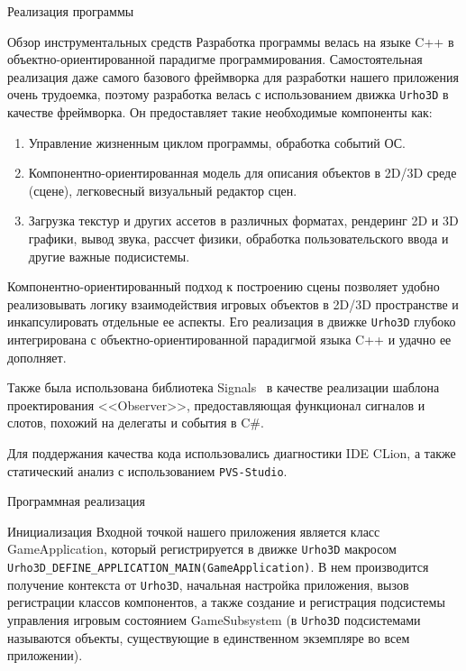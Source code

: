 \documentclass[a4paper, 14pt]{extarticle}
\begin{document}
\begin{section}{Реализация программы}
\begin{subsection}{Обзор инструментальных средств}
Разработка программы велась на языке C++ в объектно-ориентированной парадигме программирования.
Самостоятельная реализация даже самого базового фреймворка для разработки нашего приложения очень трудоемка, поэтому разработка велась с использованием движка \verb|Urho3D| в качестве фреймворка.
Он предоставляет такие необходимые компоненты как:
\begin{enumerate}
\item Управление жизненным циклом программы, обработка событий ОС.
\item Компонентно-ориентированная модель для описания объектов в 2D/3D среде (сцене), легковесный визуальный редактор сцен.
\item Загрузка текстур и других ассетов в различных форматах, рендеринг 2D и 3D графики, вывод звука, рассчет физики, обработка пользовательского ввода и другие важные подисистемы.
\end{enumerate}

Компонентно-ориентированный подход к построению сцены позволяет удобно реализовывать логику взаимодействия игровых объектов в 2D/3D пространстве и инкапсулировать отдельные ее аспекты.
Его реализация в движке \verb|Urho3D| глубоко интегрирована с объектно-ориентированной парадигмой языка C++ и удачно ее дополняет.

Также была использована библиотека Signals~\cite{signals} в качестве реализации шаблона проектирования <<Observer>>, предоставляющая функционал сигналов и слотов, похожий на делегаты и события в C\#.

Для поддержания качества кода использовались диагностики IDE CLion, а также статический анализ с использованием \verb|PVS-Studio|.
\end{subsection}

\begin{subsection}{Программная реализация}
\begin{subsubsection}{Инициализация}
Входной точкой нашего приложения является класс GameApplication, который регистрируется в движке \verb|Urho3D| макросом \verb|Urho3D_DEFINE_APPLICATION_MAIN(GameApplication)|.
В нем производится получение контекста от \verb|Urho3D|, начальная настройка приложения, вызов регистрации классов компонентов, а также создание и регистрация подсистемы управления игровым состоянием GameSubsystem (в \verb|Urho3D| подсистемами называются объекты, существующие в единственном экземпляре во всем приложении).


\end{subsubsection}
\end{subsection}
\end{section}
\end{document}
